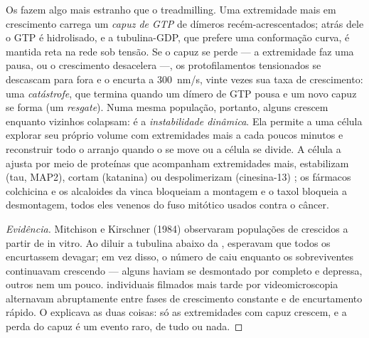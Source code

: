 \begin{definition}\label{def:b3:cytoskeleton-motility:instability}
Os  fazem algo mais estranho que o treadmilling. Uma
extremidade mais em crescimento carrega um \emph{capuz de GTP} de
dímeros recém-acrescentados; atrás dele o GTP é hidrolisado, e a
tubulina-GDP, que prefere uma conformação curva, é mantida reta na rede
sob tensão. Se o capuz se perde --- a extremidade faz uma pausa, ou o
crescimento desacelera ---, os protofilamentos tensionados se descascam
para fora e o  encurta a \qty{300}{nm/s}, vinte vezes sua
taxa de crescimento: uma \emph{catástrofe}, que termina quando um
dímero de GTP pousa e um novo capuz se forma (um \emph{resgate}). Numa
mesma população, portanto, alguns  crescem enquanto
vizinhos colapsam: é a \emph{instabilidade dinâmica}. Ela permite a uma
célula explorar seu próprio volume com extremidades mais a cada poucos
minutos e reconstruir todo o arranjo quando o  se move ou a
célula se divide. A célula a ajusta por meio de proteínas que
acompanham extremidades mais, estabilizam (tau, MAP2), cortam
(katanina) ou despolimerizam (cinesina-13) ; os fármacos
colchicina e os alcaloides da vinca bloqueiam a montagem e o taxol
bloqueia a desmontagem, todos eles venenos do fuso mitótico usados
contra o câncer.
\end{definition}

\begin{proof}[Evidência]
Mitchison e Kirschner (1984) observaram populações de 
crescidos a partir de  in vitro. Ao diluir a tubulina
abaixo da , esperavam que todos os 
encurtassem devagar; em vez disso, o número de  caiu
enquanto os sobreviventes continuavam crescendo --- alguns haviam se
desmontado por completo e depressa, outros nem um pouco. 
individuais filmados mais tarde por videomicroscopia alternavam
abruptamente entre fases de crescimento constante e de encurtamento
rápido. O  explicava as duas coisas: só as extremidades com
capuz crescem, e a perda do capuz é um evento raro, de tudo ou nada.
\end{proof}


